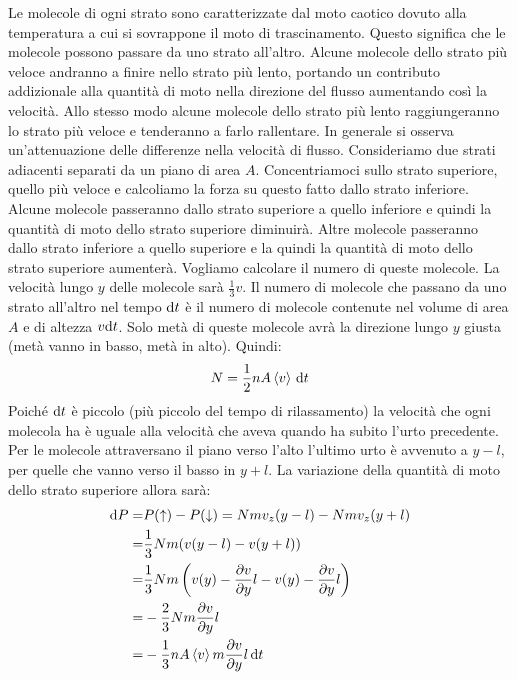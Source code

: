 Le molecole di ogni strato sono caratterizzate dal moto caotico dovuto alla temperatura a cui si sovrappone il moto di trascinamento. Questo significa che le molecole possono passare da uno strato all'altro. Alcune molecole dello strato più veloce andranno a finire nello strato più lento, portando un contributo addizionale alla quantità di moto nella direzione del flusso aumentando così la velocità. Allo stesso modo alcune molecole dello strato più lento raggiungeranno lo strato più veloce e tenderanno a farlo rallentare. In generale si osserva un'attenuazione delle differenze nella velocità di flusso.
Consideriamo due strati adiacenti separati da un piano di area $A$. Concentriamoci sullo strato superiore, quello più veloce e calcoliamo la forza su questo fatto dallo strato inferiore. Alcune molecole passeranno dallo strato superiore a quello inferiore e quindi la quantità di moto dello strato superiore diminuirà. Altre molecole passeranno dallo strato inferiore a quello superiore e la quindi la quantità di moto dello strato superiore aumenterà. Vogliamo calcolare il numero di queste molecole. La velocità lungo $y$ delle molecole sarà $\frac{1}{3} v$. Il numero di molecole che passano da uno strato all'altro nel tempo $\mathrm{d} t$ è il numero di molecole contenute nel volume di area $A$ e di altezza $v\mathrm{d} t$. Solo metà di queste molecole avrà la direzione lungo $y$ giusta (metà vanno in basso, metà in alto). Quindi:
\begin{equation}
	N = \frac{1}{2}n A\left<v\right>\,\mathrm{d} t
\end{equation}
Poiché $\mathrm{d} t$ è piccolo (più piccolo del tempo di rilassamento) la velocità che ogni molecola ha è uguale alla velocità che aveva quando ha subito l'urto precedente. Per le molecole attraversano il piano verso l'alto l'ultimo urto è avvenuto a $y-l$, per quelle che vanno verso il basso in $y+l$. La variazione della quantità di moto dello strato superiore allora sarà:
\begin{equation}
	\begin{aligned}
		\mathrm{d} P = & P(\uparrow) - P(\downarrow) = Nmv_z(y-l) - Nmv_z(y+l)                                                  \\
		=       & \frac{1}{3}Nm ( v(y-l) - v(y+l) )                                                                      \\
		=       & \frac{1}{3}Nm\left(v(y) -\frac{\partial v}{\partial y} l -v(y) - \frac{\partial v}{\partial y}l\right) \\
		=       & -\frac{2}{3}Nm\frac{\partial v}{\partial y}l                                                           \\
		=       & -\frac{1}{3}n A\left<v\right> m\frac{\partial v}{\partial y}l\,\mathrm{d} t
	\end{aligned}
\end{equation}
